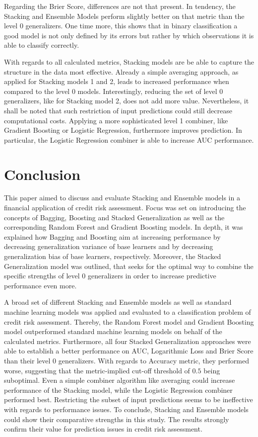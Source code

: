 \documentclass[12pt]{article}
\begin{document}
Regarding the Brier Score, differences are not that present. In tendency, the Stacking and Ensemble Models perform slightly better on that metric than the level 0 generalizers. One time more, this shows that in binary classification a good model is not only defined by its errors but rather by which observations it is able to classify correctly.

With regards to all calculated metrics, Stacking models are be able to capture the structure in the data most effective. Already a simple averaging approach, as applied for Stacking models 1 and 2, leads to increased performance when compared to the level 0 models. Interestingly, reducing the set of level 0 generalizers, like for Stacking model 2, does not add more value. Nevertheless, it shall be noted that such restriction of input predictions could still decrease computational costs. Applying a more sophisticated level 1 combiner, like Gradient Boosting or Logistic Regression, furthermore improves prediction. In particular, the Logistic Regression combiner is able to increase AUC performance. 



\section{Conclusion}
This paper aimed to discuss and evaluate Stacking and Ensemble models in a financial application of credit risk assessment. Focus was set on introducing the concepts of Bagging, Boosting and Stacked Generalization as well as the corresponding Random Forest and Gradient Boosting models. In depth, it was explained how Bagging and Boosting aim at increasing performance by decreasing generalization variance of base learners and by decreasing generalization bias of base learners, respectively. Moreover, the Stacked Generalization model was outlined, that seeks for the optimal way to combine the specific strengths of level 0 generalizers in order to increase predictive performance even more.

A broad set of different Stacking and Ensemble models as well as standard machine learning models was applied and evaluated to a classification problem of credit risk assessment. Thereby, the Random Forest model and Gradient Boosting model outperformed standard machine learning models on behalf of the calculated metrics. Furthermore, all four Stacked Generalization approaches were able to establish a better performance on AUC, Logarithmic Loss and Brier Score than their level 0 generalizers. With regards to Accuracy metric, they performed worse, suggesting that the metric-implied cut-off threshold of $0.5$ being suboptimal. Even a simple combiner algorithm like averaging could increase performance of the Stacking model, while the Logistic Regression combiner performed best. Restricting the subset of input predictions seems to be ineffective with regards to performance issues. To conclude, Stacking and Ensemble models could show their comparative strengths in this study. The results strongly confirm their value for prediction issues in credit risk assessment.
\end{document}
